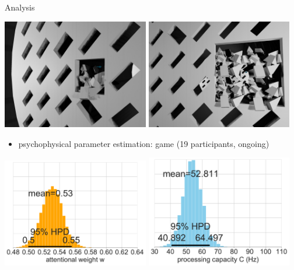 \documentclass[a0paper,portrait]{baposter}
\begin{document}
\begin{poster}
\begin{posterbox}[name=results,span=1,column=2,row=0]{Analysis}
			\begin{center}
				\includegraphics[width=0.48\textwidth]{unclear.jpg}
				\includegraphics[width=0.48\textwidth]{unclear2.jpg}
			\end{center}
			
			\begin{itemize}
				\item psychophysical parameter estimation: game (19 participants, ongoing)
			\end{itemize}
			
			\begin{center}
				\includegraphics[width=0.48\textwidth]{game-w-hdi.pdf}
				\includegraphics[width=0.48\textwidth]{game-c-hdi.pdf}
			\end{center}
			

\end{posterbox}
\end{poster}
\end{document}
